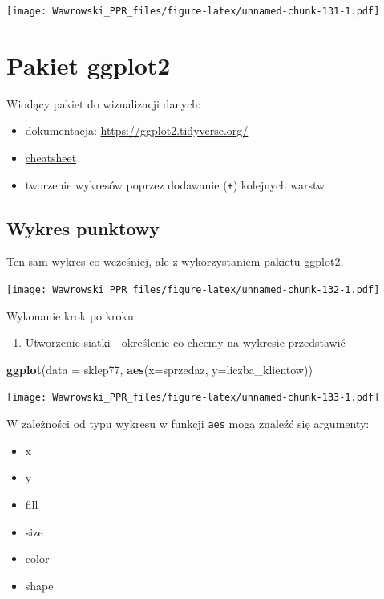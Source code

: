 \documentclass[]{book}
\newenvironment{Shaded}{\begin{snugshade}}{\end{snugshade}}
\newcommand{\KeywordTok}[1]{\textcolor[rgb]{0.13,0.29,0.53}{\textbf{#1}}}
\newcommand{\DataTypeTok}[1]{\textcolor[rgb]{0.13,0.29,0.53}{#1}}
\newcommand{\NormalTok}[1]{#1}
\providecommand{\tightlist}{%
  \setlength{\itemsep}{0pt}\setlength{\parskip}{0pt}}
\begin{document}
\texttt{[image: Wawrowski\_PPR\_files/figure-latex/unnamed-chunk-131-1.pdf]}

\section{Pakiet ggplot2}\label{pakiet-ggplot2}

Wiodący pakiet do wizualizacji danych:

\begin{itemize}
\tightlist
\item
  dokumentacja: \url{https://ggplot2.tidyverse.org/}
\item
  \href{https://github.com/rstudio/cheatsheets/blob/master/data-visualization-2.1.pdf}{cheatsheet}
\item
  tworzenie wykresów poprzez dodawanie (\texttt{+}) kolejnych warstw
\end{itemize}

\subsection{Wykres punktowy}\label{wykres-punktowy}

Ten sam wykres co wcześniej, ale z wykorzystaniem pakietu ggplot2.

\texttt{[image: Wawrowski\_PPR\_files/figure-latex/unnamed-chunk-132-1.pdf]}

Wykonanie krok po kroku:

\begin{enumerate}
\def\labelenumi{\arabic{enumi}.}
\tightlist
\item
  Utworzenie siatki - określenie co chcemy na wykresie przedstawić
\end{enumerate}

\begin{Shaded}
\begin{Highlighting}[]
\KeywordTok{ggplot}\NormalTok{(}\DataTypeTok{data =}\NormalTok{ sklep77, }\KeywordTok{aes}\NormalTok{(}\DataTypeTok{x=}\NormalTok{sprzedaz, }\DataTypeTok{y=}\NormalTok{liczba_klientow))}
\end{Highlighting}
\end{Shaded}

\texttt{[image: Wawrowski\_PPR\_files/figure-latex/unnamed-chunk-133-1.pdf]}

W zależności od typu wykresu w funkcji \texttt{aes} mogą znaleźć się
argumenty:

\begin{itemize}
\tightlist
\item
  x
\item
  y
\item
  fill
\item
  size
\item
  color
\item
  shape
\end{itemize}
\end{document}
